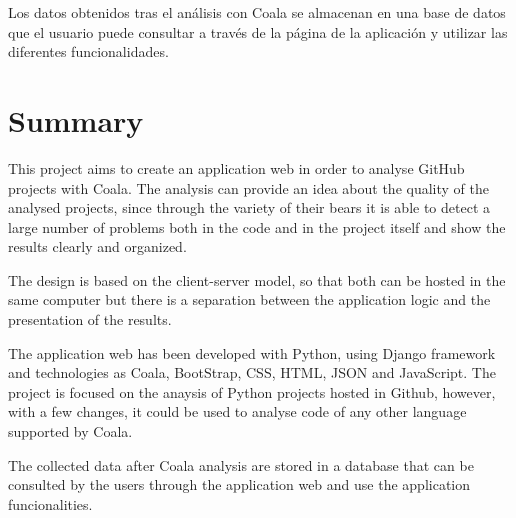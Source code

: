 \documentclass[a4paper, 12pt]{book}
\begin{document}
Los datos obtenidos tras el análisis con Coala se almacenan en una base de datos que el usuario
puede consultar a través de la página de la aplicación y utilizar las diferentes funcionalidades.

\chapter*{Summary}

This project aims to create an application web in order to analyse GitHub projects with Coala. The analysis can provide an idea about the quality of the analysed projects, since through the variety of their bears it is able to detect a large number of problems both in the code and in the project itself and show the results clearly and organized.

The design is based on the client-server model, so that both can be hosted in the same computer but there is a separation between the application logic and the presentation of the results.

The application web has been developed with Python, using Django framework and technologies as Coala, BootStrap, CSS, HTML, JSON and JavaScript. The project is focused on the anaysis of Python projects hosted in Github, however, with a few changes, it could be used to analyse code of any other language supported by Coala.

The collected data after Coala analysis are stored in a database that can be consulted by the users through the application web and use the application funcionalities.



\tableofcontents 
\cleardoublepage
\listoffigures %
\end{document}
